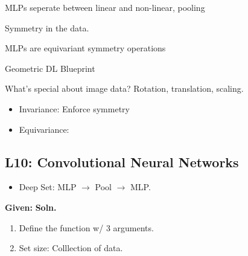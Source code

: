 \documentclass{article}
\begin{document}
MLPs seperate between linear and non-linear, pooling

Symmetry in the data. 

MLPs are equivariant symmetry operations

Geometric DL Blueprint

What's special about image data? Rotation, translation, scaling. 

\begin{summary}
    \begin{itemize}
        \item Invariance: Enforce symmetry
        \item Equivariance: 
    \end{itemize}
\end{summary}


\begin{center}
    \section*{L10: Convolutional Neural Networks}
\end{center}

\begin{summary}
    \begin{itemize}
        \item Deep Set: MLP $\rightarrow$ Pool $\rightarrow$ MLP.
    \end{itemize}
\end{summary}

\begin{example}
    \textbf{Given:}
    \textbf{Soln.}
    \begin{enumerate}
        \item Define the function w/ 3 arguments.
        \item Set size: Colllection of data. 
    \end{enumerate}

\end{example}
\end{document}
